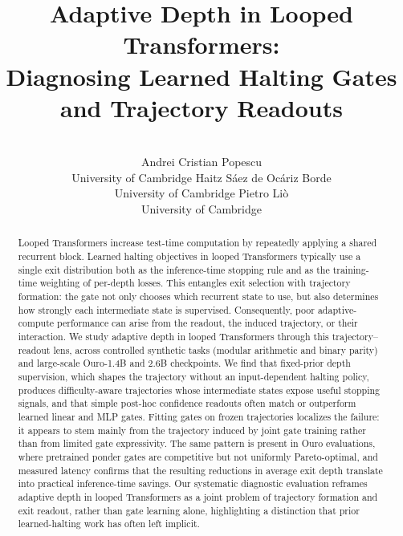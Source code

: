 \documentclass[10pt]{article} %
\title{Adaptive Depth in Looped Transformers: \\ Diagnosing Learned Halting Gates and Trajectory Readouts
}
\author{
\\
\name Andrei Cristian Popescu \\
\addr University of Cambridge
\AND
\name Haitz Sáez de Ocáriz Borde \\
\addr University of Cambridge
\AND
\name Pietro Liò \\
\addr University of Cambridge
}
\begin{document}
\maketitle
\vspace{-28pt}
\begin{abstract}
Looped Transformers increase test-time computation by repeatedly applying a shared recurrent block. Learned halting objectives in looped Transformers typically use a single exit distribution both as the inference-time stopping rule and as the training-time weighting of per-depth losses. This entangles exit selection with trajectory formation: the gate not only chooses which recurrent state to use, but also determines how strongly each intermediate state is supervised. Consequently, poor adaptive-compute performance can arise from the readout, the induced trajectory, or their interaction. We study adaptive depth in looped Transformers through this trajectory--readout lens, across controlled synthetic tasks (modular arithmetic and binary parity) and large-scale Ouro-1.4B and 2.6B checkpoints. We find that fixed-prior depth supervision, which shapes the trajectory without an input-dependent halting policy, produces difficulty-aware trajectories whose intermediate states expose useful stopping signals, and that simple post-hoc confidence readouts often match or outperform learned linear and MLP gates. Fitting gates on frozen trajectories localizes the failure: it appears to stem mainly from the trajectory induced by joint gate training rather than from limited gate expressivity. The same pattern is present in Ouro evaluations, where pretrained ponder gates are competitive but not uniformly Pareto-optimal, and measured latency confirms that the resulting reductions in average exit depth translate into practical inference-time savings. Our systematic diagnostic evaluation reframes adaptive depth in looped Transformers as a joint problem of trajectory formation and exit readout, rather than gate learning alone, highlighting a distinction that prior learned-halting work has often left implicit.
\end{abstract}

\end{document}
